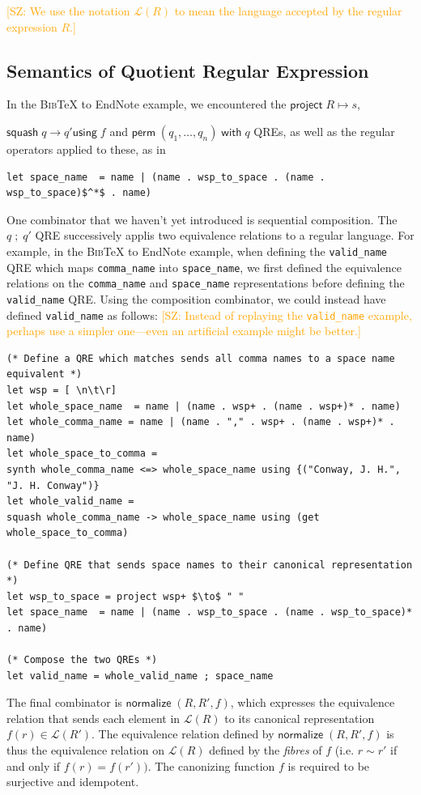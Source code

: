 \documentclass{svproc}
\newcommand{\cd}[1]{\lstinline[backgroundcolor=\color{white}]$#1$}
\newcommand{\FINISH}[3]{\ifdraft\textcolor{#1}{[#2: #3]}\fi}
\newcommand{\saz}[1]{\FINISH{orange}{SZ}{#1}}
\newcommand{\kw}[1]{\ensuremath{\mathsf{#1}}}
\newcommand{\project}[2]{\ensuremath{\kw{project} \; #1 \mapsto #2}}
\newcommand{\squash}[3]{\ensuremath{\kw{squash} \; #1 \rightarrow #2
\kw{using} \; #3}}
\newcommand{\perm}[2]{\ensuremath{\kw{perm}\; (#1)\; \kw{with}\; #2}}
\newcommand{\normalize}[3]{\ensuremath{\kw{normalize} \; (#1, #2, #3)}}
\newcommand{\bibtex}{\textsc{Bib}\TeX{}}
\newcommand{\semicolon}{\ensuremath{\; ; \;}}
\begin{document}
\saz{We use the notation $\mathcal{L}(R)$ to mean the language accepted by the
  regular expression $R$.}


\subsection{Semantics of Quotient Regular Expression}
In the \bibtex{} to EndNote example, we encountered the $\project{R}{s}$,

\noindent $\squash{q}{q'}{f}$ and $\perm{q_1, \ldots, q_n}{q}$ QREs, as well as
the regular operators applied to these, as in

\begin{lstlisting}
let space_name  = name | (name . wsp_to_space . (name . wsp_to_space)$^*$ . name)
\end{lstlisting}

One combinator that we haven't yet introduced is sequential composition.
The $q \semicolon q'$ QRE successively applis
two equivalence relations to a regular language. For example, in the \bibtex{}
to EndNote example, when defining the \cd{valid_name} QRE which maps
\cd{comma_name} into \cd{space_name}, we first defined the equivalence
relations on the \cd{comma_name} and \cd{space_name} representations before
defining the \cd{valid_name} QRE. Using the composition combinator, we could
instead have defined \cd{valid_name} as follows:
\saz{Instead of replaying the \cd{valid_name} example, perhaps use a simpler
  one---even an artificial example might be better.}

\begin{lstlisting}
(* Define a QRE which matches sends all comma names to a space name equivalent *)
let wsp = [ \n\t\r] 
let whole_space_name  = name | (name . wsp+ . (name . wsp+)* . name) 
let whole_comma_name = name | (name . "," . wsp+ . (name . wsp+)* . name) 
let whole_space_to_comma = 
synth whole_comma_name <=> whole_space_name using {("Conway, J. H.", "J. H. Conway")} 
let whole_valid_name = 
squash whole_comma_name -> whole_space_name using (get whole_space_to_comma)

(* Define QRE that sends space names to their canonical representation *)
let wsp_to_space = project wsp+ $\to$ " "
let space_name  = name | (name . wsp_to_space . (name . wsp_to_space)* . name)

(* Compose the two QREs *)
let valid_name = whole_valid_name ; space_name
\end{lstlisting}

The final combinator is  $\normalize{R}{R'}{f}$, which expresses
the equivalence relation that sends each element in $\mathcal{L}(R)$ to its
canonical representation $f(r) \in \mathcal{L}(R')$. The equivalence relation
defined by $\normalize{R}{R'}{f}$ is thus the equivalence relation on
$\mathcal{L}(R)$ defined by the {\em fibres} of $f$ (i.e. $r \sim r'$ if and
only if $f(r) = f(r'))$. The canonizing function $f$ is required to be
surjective and idempotent.
\end{document}
